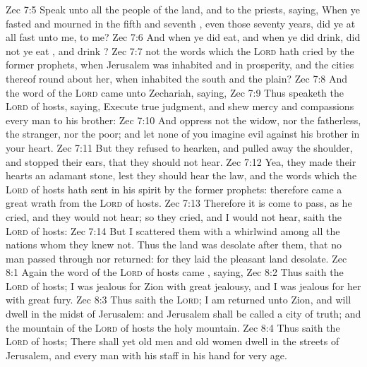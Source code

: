\vs Zec 7:5 Speak unto all the people of the land, and to the priests, saying, When ye fasted and mourned in the fifth and seventh , even those seventy years, did ye at all fast unto me,  to me?
\vs Zec 7:6 And when ye did eat, and when ye did drink, did not ye eat , and drink ?
\vs Zec 7:7  not  the words which the \textsc{Lord} hath cried by the former prophets, when Jerusalem was inhabited and in prosperity, and the cities thereof round about her, when  inhabited the south and the plain?
\vs Zec 7:8 And the word of the \textsc{Lord} came unto Zechariah, saying,
\vs Zec 7:9 Thus speaketh the \textsc{Lord} of hosts, saying, Execute true judgment, and shew mercy and compassions every man to his brother:
\vs Zec 7:10 And oppress not the widow, nor the fatherless, the stranger, nor the poor; and let none of you imagine evil against his brother in your heart.
\vs Zec 7:11 But they refused to hearken, and pulled away the shoulder, and stopped their ears, that they should not hear.
\vs Zec 7:12 Yea, they made their hearts  an adamant stone, lest they should hear the law, and the words which the \textsc{Lord} of hosts hath sent in his spirit by the former prophets: therefore came a great wrath from the \textsc{Lord} of hosts.
\vs Zec 7:13 Therefore it is come to pass,  as he cried, and they would not hear; so they cried, and I would not hear, saith the \textsc{Lord} of hosts:
\vs Zec 7:14 But I scattered them with a whirlwind among all the nations whom they knew not. Thus the land was desolate after them, that no man passed through nor returned: for they laid the pleasant land desolate.
\vs Zec 8:1 Again the word of the \textsc{Lord} of hosts came , saying,
\vs Zec 8:2 Thus saith the \textsc{Lord} of hosts; I was jealous for Zion with great jealousy, and I was jealous for her with great fury.
\vs Zec 8:3 Thus saith the \textsc{Lord}; I am returned unto Zion, and will dwell in the midst of Jerusalem: and Jerusalem shall be called a city of truth; and the mountain of the \textsc{Lord} of hosts the holy mountain.
\vs Zec 8:4 Thus saith the \textsc{Lord} of hosts; There shall yet old men and old women dwell in the streets of Jerusalem, and every man with his staff in his hand for very age.
